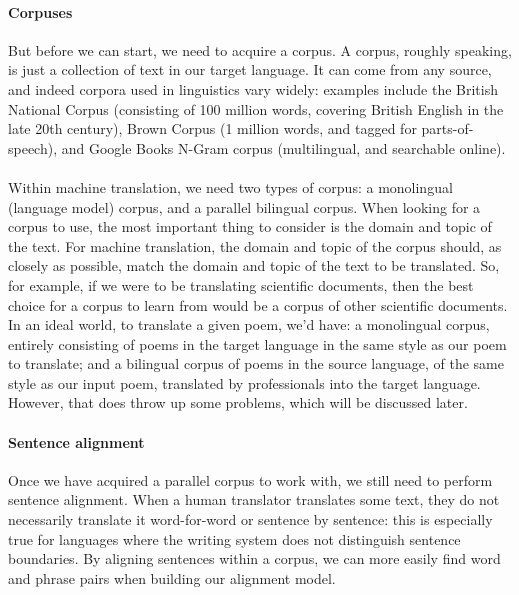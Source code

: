 \paragraph{Corpuses}{But before we can start, we need to acquire a
  corpus. A corpus, roughly speaking, is just a collection of text in
  our target language. It can come from any source, and indeed corpora
  used in linguistics vary widely: examples include the British
  National Corpus (consisting of 100 million words, covering British
  English in the late 20th century), Brown Corpus (1 million words,
  and tagged for parts-of-speech), and Google Books N-Gram corpus
  (multilingual, and searchable online).}
\paragraph{}{Within machine translation, we need two types of corpus:
  a monolingual (language model) corpus, and a parallel bilingual
  corpus. When looking for a corpus to use, the most important thing
  to consider is the domain and topic of the text. For machine
  translation, the domain and topic of the corpus should, as closely
  as possible, match the domain and topic of the text to be
  translated. So, for example, if we were to be translating scientific
  documents, then the best choice for a corpus to learn from would be
  a corpus of other scientific documents.  In an ideal world, to
  translate a given poem, we'd have: a monolingual corpus, entirely
  consisting of poems in the target language in the same style as our
  poem to translate; and a bilingual corpus of poems in the source
  language, of the same style as our input poem, translated by
  professionals into the target language. However, that does throw up
  some problems, which will be discussed later. }

\paragraph{Sentence alignment}{Once we have acquired a parallel corpus
  to work with, we still need to perform sentence alignment. When a
  human translator translates some text, they do not necessarily
  translate it word-for-word or sentence by sentence: this is
  especially true for languages where the writing system does not
  distinguish sentence boundaries. By aligning sentences within a
  corpus, we can more easily find word and phrase pairs when building
  our alignment model.}

